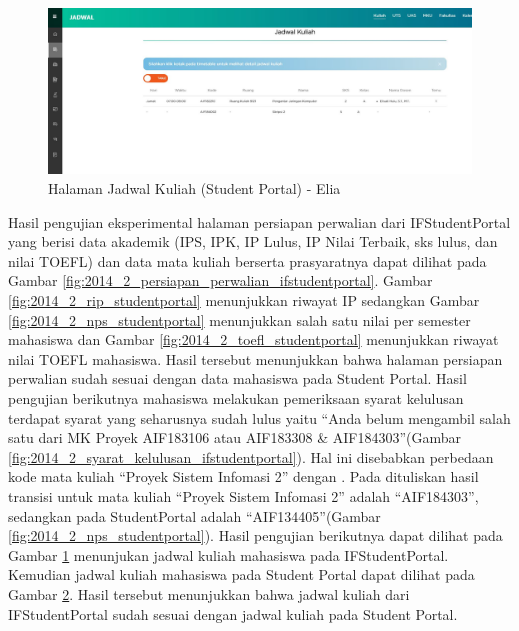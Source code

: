 \begin{itemize}
\begin{enumerate}
\begin{figure}[H]
			\label{fig:2014_2_jadwal_kuliah_ifstudentportal}
		\end{figure}
		\begin{figure}[H]
			\centering
			\includegraphics[scale=0.35]{Gambar/HasilPengujian/2014_2_jadwal_kuliah_studentportal}
			\caption{Halaman Jadwal Kuliah (Student Portal) - Elia}
			\label{fig:2014_2_jadwal_kuliah_studentportal}
		\end{figure}
		Hasil pengujian eksperimental halaman persiapan perwalian dari IFStudentPortal yang berisi data akademik (IPS, IPK, IP Lulus, IP Nilai Terbaik, sks lulus, dan nilai TOEFL) dan data mata kuliah berserta prasyaratnya dapat dilihat pada Gambar \ref{fig:2014_2_persiapan_perwalian_ifstudentportal}. Gambar \ref{fig:2014_2_rip_studentportal} menunjukkan riwayat IP sedangkan Gambar \ref{fig:2014_2_nps_studentportal} menunjukkan salah satu nilai per semester mahasiswa dan Gambar \ref{fig:2014_2_toefl_studentportal} menunjukkan riwayat nilai TOEFL mahasiswa. Hasil tersebut menunjukkan bahwa halaman persiapan perwalian sudah sesuai dengan data mahasiswa pada Student Portal. Hasil pengujian berikutnya mahasiswa melakukan pemeriksaan syarat kelulusan terdapat syarat yang seharusnya sudah lulus yaitu ``Anda belum mengambil salah satu dari MK Proyek AIF183106 atau AIF183308 \& AIF184303''(Gambar \ref{fig:2014_2_syarat_kelulusan_ifstudentportal}). Hal ini disebabkan perbedaan kode mata kuliah ``Proyek Sistem Infomasi 2'' dengan \cite{dokumenkurikulum2018}. Pada \cite{dokumenkurikulum2018} dituliskan hasil transisi untuk mata kuliah ``Proyek Sistem Infomasi 2'' adalah ``AIF184303'', sedangkan pada StudentPortal adalah ``AIF134405''(Gambar \ref{fig:2014_2_nps_studentportal}). Hasil pengujian berikutnya dapat dilihat pada Gambar \ref{fig:2014_2_jadwal_kuliah_ifstudentportal} menunjukan jadwal kuliah mahasiswa pada IFStudentPortal. Kemudian jadwal kuliah mahasiswa pada Student Portal dapat dilihat pada Gambar \ref{fig:2014_2_jadwal_kuliah_studentportal}. Hasil tersebut menunjukkan bahwa jadwal kuliah dari IFStudentPortal sudah sesuai dengan jadwal kuliah pada Student Portal.

\end{enumerate}
\end{itemize}
